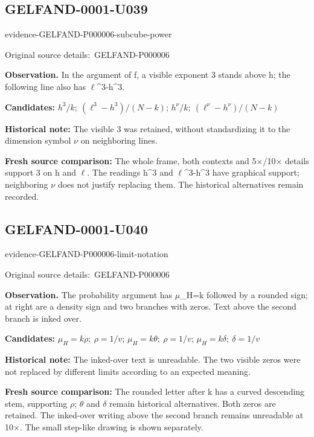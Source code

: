 \documentclass[11pt]{article}
\newcommand{\EvidenceBlock}[4]{%
 \par\smallskip\noindent\begin{minipage}{\linewidth}
 \begin{minipage}[t]{.47\linewidth}\vspace{0pt}\centering
 \csname evidence-#1-#2\endcsname\par
 {\scriptsize\SourceCropCaption\ #1}\par
 \end{minipage}\hfill
 \begin{minipage}[t]{.49\linewidth}\vspace{0pt}\raggedright
 {\small\color{orange!65!black}\textbf{#4} #3}\par
 \end{minipage}
 \end{minipage}\par\smallskip}
\newcommand{\SourceCropCaption}{Original source details:}\newcommand{\ReadingCaption}{Uncertain reading.}\newcommand{\IncompleteCaption}{Undeciphered passage.}\newcommand{\DiagramCaption}{Diagram and typed description.}
\begin{document}
\subsection*{GELFAND-0001-U039}
\EvidenceBlock{GELFAND-P000006}{subcube-power}{In the argument of f, a visible exponent 3 stands above h; the following line also has \(\ell\)\textasciicircum{}3-h\textasciicircum{}3.}{Observation.}
\par\smallskip\noindent\textbf{Candidates: } \(h^3/k;\ (\ell^3-h^3)/(N-k)\); \(h^\nu/k;\ (\ell^\nu-h^\nu)/(N-k)\)\par
\par\smallskip\noindent\textbf{Historical note: } The visible 3 was retained, without standardizing it to the dimension symbol \(\nu\) on neighboring lines.\par
\par\smallskip\noindent\textbf{Fresh source comparison: } The whole frame, both contexts and 5×/10× details support 3 on h and \(\ell\). The readings h\textasciicircum{}3 and \(\ell\)\textasciicircum{}3-h\textasciicircum{}3 have graphical support; neighboring \(\nu\) does not justify replacing them. The historical alternatives remain recorded.\par

\subsection*{GELFAND-0001-U040}
\EvidenceBlock{GELFAND-P000006}{limit-notation}{The probability argument has \(\mu\)\_H=k followed by a rounded sign; at right are a density sign and two branches with zeros. Text above the second branch is inked over.}{Observation.}
\par\smallskip\noindent\textbf{Candidates: } \(\mu_H=k\rho;\ \rho=1/v\); \(\mu_H=k\theta;\ \rho=1/v\); \(\mu_H=k\delta;\ \delta=1/v\)\par
\par\smallskip\noindent\textbf{Historical note: } The inked-over text is unreadable. The two visible zeros were not replaced by different limits according to an expected meaning.\par
\par\smallskip\noindent\textbf{Fresh source comparison: } The rounded letter after k has a curved descending stem, supporting \(\rho\); \(\theta\) and \(\delta\) remain historical alternatives. Both zeros are retained. The inked-over writing above the second branch remains unreadable at 10×. The small step-like drawing is shown separately.\par
\end{document}
